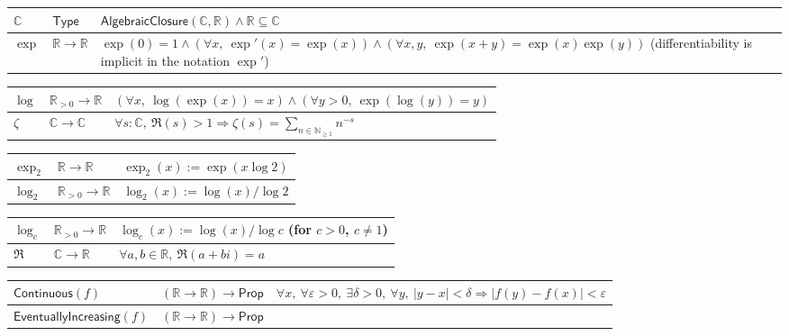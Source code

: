 \documentclass[11pt,reqno]{amsart}
\theoremstyle{blueplain}
\numberwithin{equation}{section}
\begin{document}
{\begin{tabular}{|m{4cm}|m{5cm}|m{9cm}|}
		\hline
		$\mathbb{C}$ & $\mathsf{Type}$ &
		$\mathsf{AlgebraicClosure}(\mathbb{C},\mathbb{R})\wedge\mathbb{R}\subseteq\mathbb{C}$ \\ \hline
		$\exp$ & $\mathbb{R}\to\mathbb{R}$ &
		$\exp(0)=1\wedge(\forall x,\ \exp'(x)=\exp(x))
		\wedge(\forall x,y,\ \exp(x+y)=\exp(x)\exp(y))$
		(differentiability is implicit in the notation $\exp'$) \\ 
	\end{tabular}%
	\noindent \newline
	\noindent
	\noindent \newline
	\noindent
	\begin{tabular}{|m{4cm}|m{5cm}|m{9cm}|}
		\hline
		$\log$ & $\mathbb{R}_{>0}\to\mathbb{R}$ &
		$(\forall x,\ \log(\exp(x))=x)\wedge(\forall y>0,\ \exp(\log(y))=y)$ \\ \hline
		$\zeta$ & $\mathbb{C}\to\mathbb{C}$ &
		$\forall s:\mathbb{C},\ \Re(s)>1\Rightarrow\zeta(s)=\sum_{n\in\mathbb{N}_{\geq 1}}n^{-s}$ \\
	\end{tabular}%
	\noindent \newline
	\noindent
	\begin{tabular}{|m{4cm}|m{5cm}|m{9cm}|}
		\hline
		$\exp_2$ & $\mathbb{R}\to\mathbb{R}$ &
		$\exp_2(x):=\exp(x\log 2)$ \\ \hline
		$\log_2$ & $\mathbb{R}_{>0}\to\mathbb{R}$ &
		$\log_2(x):=\log(x)/\log 2$ \\ 
	\end{tabular}
	\noindent \newline
	\noindent
	\begin{tabular}{|m{4cm}|m{5cm}|m{9cm}|}
		\hline
		$\log_c$ & $\mathbb{R}_{>0}\to\mathbb{R}$ &
		$\log_c(x):=\log(x)/\log c$ \quad (for $c>0$, $c\neq 1$) \\ \hline
		$\Re$ & $\mathbb{C}\to\mathbb{R}$ &
		$\forall a,b\in\mathbb{R},\ \Re(a+bi)=a$ \\
	\end{tabular}%
	\noindent \newline
	\noindent
	\begin{tabular}{|m{4cm}|m{5cm}|m{9cm}|}
		\hline
		$\mathsf{Continuous}(f)$ & $(\mathbb{R}\to\mathbb{R})\to\mathsf{Prop}$ &
		$\forall x,\ \forall\varepsilon>0,\ \exists\delta>0,\ \forall y,\
		|y-x|<\delta\Rightarrow|f(y)-f(x)|<\varepsilon$ \\ \hline
		$\mathsf{EventuallyIncreasing}(f)$ & $(\mathbb{R}\to\mathbb{R})\to\mathsf{Prop}$ &

\end{tabular}}
\end{document}

